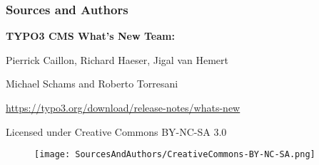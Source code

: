 \begin{frame}[fragile]
	\frametitle{Sources and Authors}

	\vspace{-0.6cm}

	\centerline{\textbf{TYPO3 CMS What's New Team:}}

	\begin{center}
		\centerline{Pierrick Caillon, Richard Haeser, Jigal van Hemert}
		\centerline{Michael Schams and Roberto Torresani}
	\end{center}

	\vspace{0.8cm}

	\smaller\begin{center}\url{https://typo3.org/download/release-notes/whats-new}\end{center}\normalsize

	\vspace{1cm}

	\smaller\begin{center}Licensed under Creative Commons BY-NC-SA 3.0\end{center}\normalsize
	\begin{figure}\vspace*{-0.4cm}
		\texttt{[image: SourcesAndAuthors/CreativeCommons-BY-NC-SA.png]}
	\end{figure}

\end{frame}

